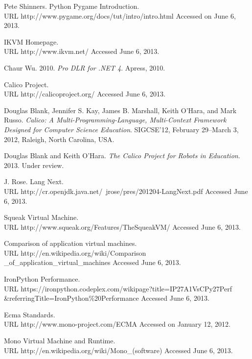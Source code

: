 \documentclass[preprint]{sigplanconf}
\begin{document}
\begin{thebibliography}{}
Pete Shinners. Python Pygame Introduction.\\ URL http://www.pygame.org/docs/tut/intro/intro.html Accessed on June 6, 2013.

IKVM Homepage.\\ URL http://www.ikvm.net/ Accessed June 6, 2013.

Chaur Wu. 2010. \textit{Pro DLR for .NET 4}. Apress, 2010.

Calico Project.\\ URL http://calicoproject.org/ Accessed June 6, 2013.

 Douglas Blank, Jennifer S. Kay, James
  B. Marshall, Keith O'Hara, and Mark Russo. \textit{Calico: A
    Multi-Programming-Language, Multi-Context Framework Designed for
    Computer Science Education}.  SIGCSE’12, February 29–March 3,
  2012, Raleigh, North Carolina, USA.

 Douglas Blank and Keith
  O'Hara. \textit{The Calico Project for Robots in
    Education}. 2013. Under review.

J. Rose. Lang Next.\\ URL
http://cr.openjdk.java.net/~jrose/pres/201204-LangNext.pdf Accessed
June 6, 2013.

Squeak Virtual Machine.\\ URL http://www.squeak.org/Features/TheSqueakVM/ Accessed June 6, 2013.

 Comparison of application virtual machines.\\ URL
  http://en.wikipedia.org/wiki/Comparison \_of\_application\_virtual\_machines
  Accessed June 6, 2013.

 IronPython Performance. \\ URL
  https://ironpython.codeplex.com/wikipage?title=IP27A1VsCPy27Perf
  \&referringTitle=IronPython\%20Performance Accessed June 6, 2013.

 Ecma Standards.\\
URL http://www.mono-project.com/ECMA Accessed on January 12, 2012.

 Mono Virtual Machine and Runtime.\\ URL http://en.wikipedia.org/wiki/Mono\_(software) Accessed June 6, 2013.


\end{thebibliography}
\end{document}
